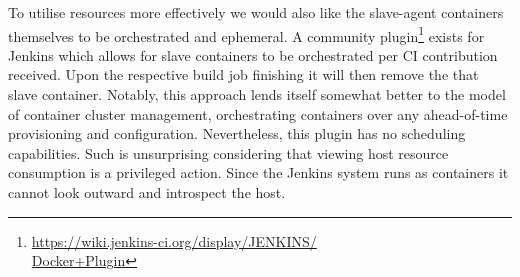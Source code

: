 \documentclass{report}
\begin{document}
To utilise resources more effectively we would also like the slave-agent containers themselves to be orchestrated and ephemeral. 
A community plugin\footnote{\href{https://wiki.jenkins-ci.org/display/JENKINS/Docker+Plugin}{https://wiki.jenkins-ci.org/display/JENKINS/\\Docker+Plugin}} exists 
for Jenkins which allows for slave containers to be orchestrated per CI contribution received. Upon the respective 
build job finishing it will then remove the that slave container. Notably, this approach lends itself somewhat better to
the model of container cluster management, orchestrating containers over any ahead-of-time provisioning and configuration.
Nevertheless, this plugin has no scheduling capabilities. Such is unsurprising considering that viewing host resource consumption 
is a privileged action. Since the Jenkins system runs as containers it cannot look outward and introspect the host.
\end{document}
